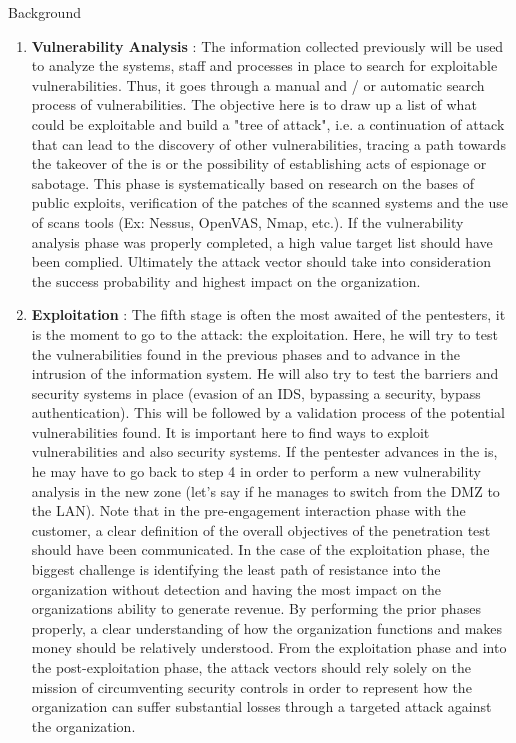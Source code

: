 \begin{chaptercover}{Background}
\begin{enumerate}
  \item \textbf{Vulnerability Analysis} : The information collected previously will be used to analyze the systems, staff and processes in place to search for exploitable vulnerabilities. Thus, it goes through a manual and / or automatic search process of vulnerabilities. The objective here is to draw up a list of what could be exploitable and build a "tree of attack", i.e. a continuation of attack that can lead to the discovery of other vulnerabilities, tracing a path towards the takeover of the \acrshort{is} or the possibility of establishing acts of espionage or sabotage. This phase is systematically based on research on the bases of public exploits, verification of the patches of the scanned systems and the use of scans tools (Ex: Nessus, OpenVAS, Nmap, etc.). If the vulnerability analysis phase was properly completed, a high value target list should have been complied. Ultimately the attack vector should take into consideration the success probability and highest impact on the organization.
  \item \textbf{Exploitation} : The fifth stage is often the most awaited of the pentesters, it is the moment to go to the attack: the exploitation. Here, he will try to test the vulnerabilities found in the previous phases and to advance in the intrusion of the information system. He will also try to test the barriers and security systems in place (evasion of an IDS, bypassing a security, bypass authentication). This will be followed by a validation process of the potential vulnerabilities found. It is important here to find ways to exploit vulnerabilities and also security systems. If the pentester advances in the \acrshort{is}, he may have to go back to step 4 in order to perform a new vulnerability analysis in the new zone (let's say if he manages to switch from the DMZ to the LAN). Note that in the pre-engagement interaction phase with the customer, a clear definition of the overall objectives of the penetration test should have been communicated. In the case of the exploitation phase, the biggest challenge is identifying the least path of resistance into the organization without detection and having the most impact on the organizations ability to generate revenue. By performing the prior phases properly, a clear understanding of how the organization functions and makes money should be relatively understood. From the exploitation phase and into the post-exploitation phase, the attack vectors should rely solely on the mission of circumventing security controls in order to represent how the organization can suffer substantial losses through a targeted attack against the organization.

\end{enumerate}
\end{chaptercover}
